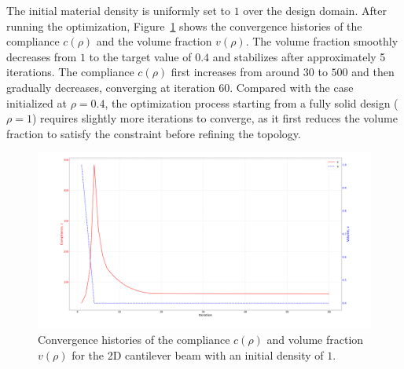 \documentclass[mathpazo]{cicp}
\begin{document}
The initial material density is uniformly set to $1$ over the design domain. After running the optimization, Figure~\ref{fig:canti_1_convergence} shows the convergence histories of the compliance $c(\rho)$ and the volume fraction $v(\rho)$. The volume fraction smoothly decreases from $1$ to the target value of $0.4$ and stabilizes after approximately 5 iterations. The compliance $c(\rho)$ first increases from around $30$ to $500$ and then gradually decreases, converging at iteration 60. Compared with the case initialized at $\rho = 0.4$, the optimization process starting from a fully solid design ($\rho = 1$) requires slightly more iterations to converge, as it first reduces the volume fraction to satisfy the constraint before refining the topology.
\begin{figure}[htp]
	\centering
	\includegraphics[width=1.0\textwidth]{figures/cantilever_2d_1_convergence.png}
	\caption{Convergence histories of the compliance $c(\rho)$ and volume fraction $v(\rho)$ for the 2D cantilever beam with an initial density of $1$.}
	\label{fig:canti_1_convergence}
\end{figure}
\end{document}
